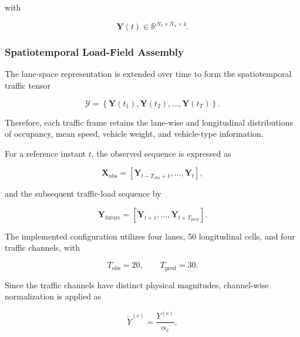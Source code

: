 \documentclass[journal]{IEEEtran}
\newcommand{\mathbfcal}[1]{\boldsymbol{\mathcal{#1}}}
\begin{document}
with

\begin{equation}
\mathbf{Y}(t)
\in
\mathbb{R}^{N_{\ell}\times N_x\times 4}.
\label{eq:traffic_field_dimension}
\end{equation}


\subsubsection{Spatiotemporal Load-Field Assembly}
\label{subsec:spatiotemporal_field}

The lane-space representation is extended over time to form the spatiotemporal traffic tensor

\begin{equation}
\mathbfcal{Y}
=
\left\{
\mathbf{Y}(t_1),
\mathbf{Y}(t_2),
\ldots,
\mathbf{Y}(t_T)
\right\}.
\label{eq:spatiotemporal_tensor}
\end{equation}

Therefore, each traffic frame retains the lane-wise and longitudinal distributions of occupancy, mean speed, vehicle weight, and vehicle-type information.

For a reference instant $t$, the observed sequence is expressed as

\begin{equation}
\mathbf{X}_{\mathrm{obs}}
=
\left[
\mathbf{Y}_{t-T_{\mathrm{obs}}+1},
\ldots,
\mathbf{Y}_{t}
\right],
\label{eq:observed_sequence}
\end{equation}

and the subsequent traffic-load sequence by

\begin{equation}
\mathbf{Y}_{\mathrm{future}}
=
\left[
\mathbf{Y}_{t+1},
\ldots,
\mathbf{Y}_{t+T_{\mathrm{pred}}}
\right].
\label{eq:future_sequence}
\end{equation}

The implemented configuration utilizes four lanes, 50 longitudinal cells, and four traffic channels, with

\begin{equation}
T_{\mathrm{obs}}=20,
\qquad
T_{\mathrm{pred}}=30.
\label{eq:sequence_lengths}
\end{equation}

Since the traffic channels have distinct physical magnitudes, channel-wise normalization is applied as

\begin{equation}
\widetilde{Y}^{(c)}
=
\frac{Y^{(c)}}{\alpha_c},
\label{eq:channel_normalization}
\end{equation}
\end{document}
